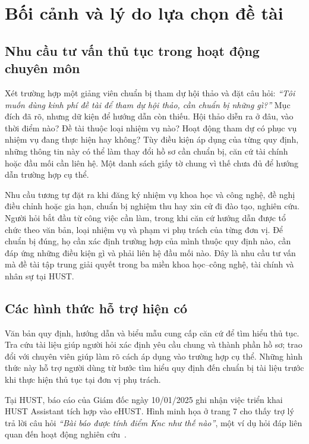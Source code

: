 \section{Bối cảnh và lý do lựa chọn đề tài}
\label{sec:boi-canh}

\subsection{Nhu cầu tư vấn thủ tục trong hoạt động chuyên môn}
Xét trường hợp một giảng viên chuẩn bị tham dự hội thảo và đặt câu hỏi:
\textit{``Tôi muốn dùng kinh phí đề tài để tham dự hội thảo, cần chuẩn bị những
gì?''} Mục đích đã rõ, nhưng dữ kiện để hướng dẫn còn thiếu. Hội thảo diễn
ra ở đâu, vào thời điểm nào? Đề tài thuộc loại nhiệm vụ nào? Hoạt động tham
dự có phục vụ nhiệm vụ đang thực hiện hay không? Tùy điều kiện áp dụng của
từng quy định, những thông tin này có thể làm thay đổi hồ sơ cần chuẩn bị,
căn cứ tài chính hoặc đầu mối cần liên hệ. Một danh sách giấy tờ chung vì
thế chưa đủ để hướng dẫn trường hợp cụ thể.

Nhu cầu tương tự đặt ra khi đăng ký nhiệm vụ khoa học và công nghệ, đề nghị
điều chỉnh hoặc gia hạn, chuẩn bị nghiệm thu hay xin cử đi đào tạo, nghiên
cứu. Người hỏi bắt đầu từ công việc cần làm, trong khi căn cứ hướng dẫn được
tổ chức theo văn bản, loại nhiệm vụ và phạm vi phụ trách của từng đơn vị.
Để chuẩn bị đúng, họ cần xác định trường hợp của mình thuộc quy định nào,
cần đáp ứng những điều kiện gì và phải liên hệ đầu mối nào. Đây là nhu cầu
tư vấn mà đề tài tập trung giải quyết trong ba miền khoa học--công nghệ,
tài chính và nhân sự tại HUST.

\subsection{Các hình thức hỗ trợ hiện có}
Văn bản quy định, hướng dẫn và biểu mẫu cung cấp căn cứ để tìm hiểu thủ tục.
Tra cứu tài liệu giúp người hỏi xác định yêu cầu chung và thành phần hồ sơ;
trao đổi với chuyên viên giúp làm rõ cách áp dụng vào trường hợp cụ thể.
Những hình thức này hỗ trợ người dùng từ bước tìm hiểu quy định đến chuẩn
bị tài liệu trước khi thực hiện thủ tục tại đơn vị phụ trách.

Tại HUST, báo cáo của Giám đốc ngày 10/01/2025 ghi nhận việc triển khai
HUST Assistant tích hợp vào eHUST. Hình minh họa ở trang 7 cho thấy trợ lý
trả lời câu hỏi \textit{``Bài báo được tính điểm Knc như thế nào''}, một ví
dụ hỏi đáp liên quan đến hoạt động nghiên cứu~\cite{hust2025baocao}.

